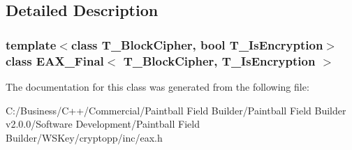 \subsection{Detailed Description}
\subsubsection*{template$<$class T\_\-BlockCipher, bool T\_\-IsEncryption$>$ class EAX\_\-Final$<$ T\_\-BlockCipher, T\_\-IsEncryption $>$}



The documentation for this class was generated from the following file:\begin{DoxyCompactItemize}
\item 
C:/Business/C++/Commercial/Paintball Field Builder/Paintball Field Builder v2.0.0/Software Development/Paintball Field Builder/WSKey/cryptopp/inc/eax.h\end{DoxyCompactItemize}
